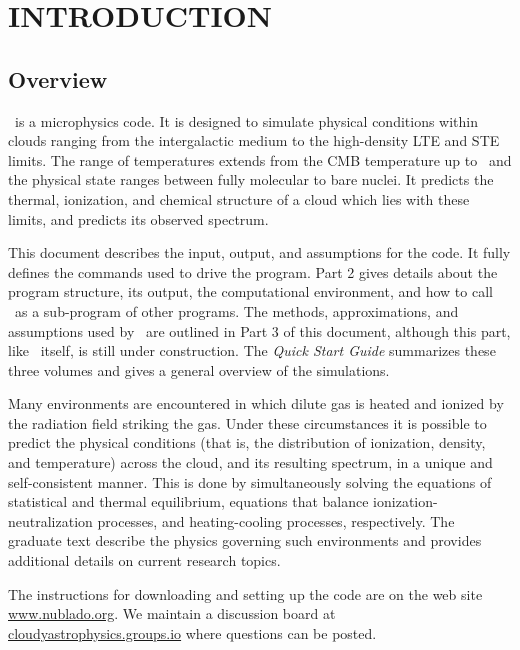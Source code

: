 \chapter{INTRODUCTION}

\section{Overview}

\noindent \Cloudy\ is a microphysics code.
It is designed to simulate physical conditions within clouds
ranging from the intergalactic
medium to the high-density LTE and STE limits.
The range of temperatures extends from the CMB temperature
up to \TEMPLIMITHIGH\ and the physical state
ranges between fully molecular to bare nuclei.
It predicts the thermal, ionization, and chemical structure
of a cloud which lies with these limits, and
predicts its observed spectrum.

This document describes the input, output,
and assumptions for the code.
It fully defines the commands used to drive the
program.
Part 2 gives details about the program
structure, its output, the computational environment, and how to call \Cloudy\
as a sub-program of other programs.
The methods, approximations, and assumptions used by \Cloudy\ are
outlined in Part 3 of this document, although this part, like \Cloudy\ itself,
is still under construction.
The \emph{Quick Start Guide} summarizes these
three volumes and gives a general overview of the simulations.

Many environments are encountered in which dilute gas is heated and
ionized by the radiation field striking the gas.  Under these
circumstances it is possible to predict the physical conditions (that
is, the distribution of ionization, density, and temperature) across
the cloud, and its resulting spectrum, in a unique and self-consistent
manner.  This is done by simultaneously solving the equations of
statistical and thermal equilibrium, equations that balance
ionization-neutralization processes, and heating-cooling processes,
respectively.  The graduate text \citet[hereafter
AGN3]{Osterbrock2006} describe the physics governing such environments
and \citet{Ferland2003} provides additional details on current
research topics.

The instructions for downloading and
setting up the code are on the web site
\href{http://www.nublado.org}{www.nublado.org}.
We maintain a discussion board at
\href{https://cloudyastrophysics.groups.io}
{cloudyastrophysics.groups.io}
where questions can be posted.

